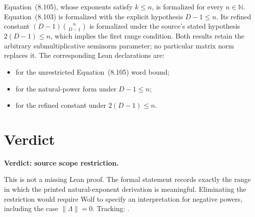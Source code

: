 \documentclass{article}
\begin{document}
Equation~(8.105), whose exponents satisfy $k\le n$, is formalized for every
$n\in\mathbb N$.  Equation~(8.103) is formalized with the explicit hypothesis
$D-1\le n$.  Its refined constant $(D-1)\binom{n}{D-1}$ is formalized under
the source's stated hypothesis $2(D-1)\le n$, which implies the first range
condition.  Both results retain the arbitrary submultiplicative seminorm
parameter; no particular matrix norm replaces it.  The corresponding Lean
declarations are:
\begin{itemize}
  \item {} for the unrestricted
    Equation~(8.105) word bound;
  \item {} for the natural-power form under
    $D-1\le n$;
  \item {} for the refined constant under
    $2(D-1)\le n$.
\end{itemize}

\section{Verdict}

\textbf{Verdict: source scope restriction.}

This is not a missing Lean proof.  The
formal statement records exactly the range in which the printed
natural-exponent derivation is meaningful.  Eliminating the restriction would
require Wolf to specify an interpretation for negative powers, including the
case $\lVert\Lambda\rVert=0$.  Tracking: .



\end{document}
